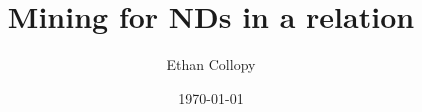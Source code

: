 \def \weak{\mid\!\approx}
\def \notweak{\mid\!\not\approx}
\def \mm{\mathcal{M}}
\def \cover{-\!\!\!\!<}
\def \half{\frac{1}{2}}
\def \ttb{\begin{ttfamily}}
\def \tte{\end{ttfamily}}
\def \na{\newcounter{alg}\setcounter{alg}{1}\arabic{alg}}
\def \ra{\setcounter{alg}{1}\arabic{alg}}
\def \sa{\stepcounter{alg}\arabic{alg}}
\def \techrep{\cite{cl98}}

\documentclass[11pt]{article}
\usepackage[dvips]{graphics}
\usepackage{latexsym,ucl_a4}


\title{Mining for NDs in a relation}

\author{ Ethan Collopy}

\date{\today}  
 
 
        

\maketitle 

\newtheorem{theorem}{Theorem}[section]
\newtheorem{corollary}[theorem]{Corollary}
\newtheorem{lemma}[theorem]{Lemma}
\newtheorem{proposition}[theorem]{Proposition}
\newtheorem{definition}{Definition}[section]
\newtheorem{algorithm}{Algorithm}
\newtheorem{example}{Example}[section]


\section{Algorithm}

We consider only singleton right hand sides. For a relation $R$ with
$n$ attributes we have $n 2^{n-1}$ NDs returned by this algorithm.

\medskip


